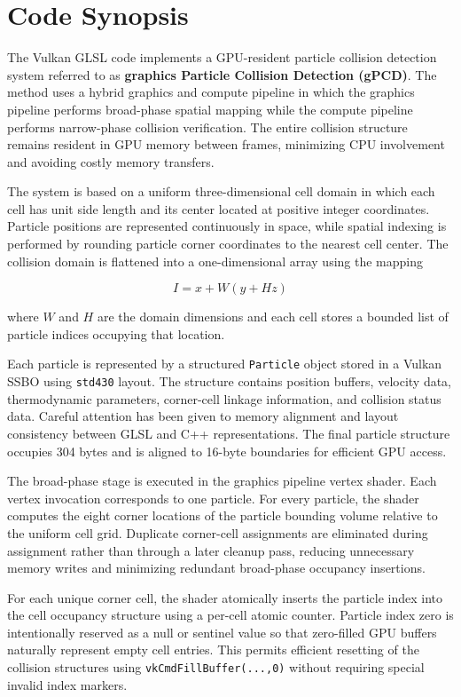 \documentclass{article}
\begin{document}
\section{Code Synopsis}

The Vulkan GLSL code implements a GPU-resident particle collision detection system referred to as \textbf{graphics Particle Collision Detection (gPCD)}. The method uses a hybrid graphics and compute pipeline in which the graphics pipeline performs broad-phase spatial mapping while the compute pipeline performs narrow-phase collision verification. The entire collision structure remains resident in GPU memory between frames, minimizing CPU involvement and avoiding costly memory transfers.

The system is based on a uniform three-dimensional cell domain in which each cell has unit side length and its center located at positive integer coordinates. Particle positions are represented continuously in space, while spatial indexing is performed by rounding particle corner coordinates to the nearest cell center. The collision domain is flattened into a one-dimensional array using the mapping

\[
I = x + W(y + Hz)
\]

where \(W\) and \(H\) are the domain dimensions and each cell stores a bounded list of particle indices occupying that location.

Each particle is represented by a structured \texttt{Particle} object stored in a Vulkan SSBO using \texttt{std430} layout. The structure contains position buffers, velocity data, thermodynamic parameters, corner-cell linkage information, and collision status data. Careful attention has been given to memory alignment and layout consistency between GLSL and C++ representations. The final particle structure occupies 304 bytes and is aligned to 16-byte boundaries for efficient GPU access.

The broad-phase stage is executed in the graphics pipeline vertex shader. Each vertex invocation corresponds to one particle. For every particle, the shader computes the eight corner locations of the particle bounding volume relative to the uniform cell grid. Duplicate corner-cell assignments are eliminated during assignment rather than through a later cleanup pass, reducing unnecessary memory writes and minimizing redundant broad-phase occupancy insertions.

For each unique corner cell, the shader atomically inserts the particle index into the cell occupancy structure using a per-cell atomic counter. Particle index zero is intentionally reserved as a null or sentinel value so that zero-filled GPU buffers naturally represent empty cell entries. This permits efficient resetting of the collision structures using \texttt{vkCmdFillBuffer(...,0)} without requiring special invalid index markers.
\end{document}
